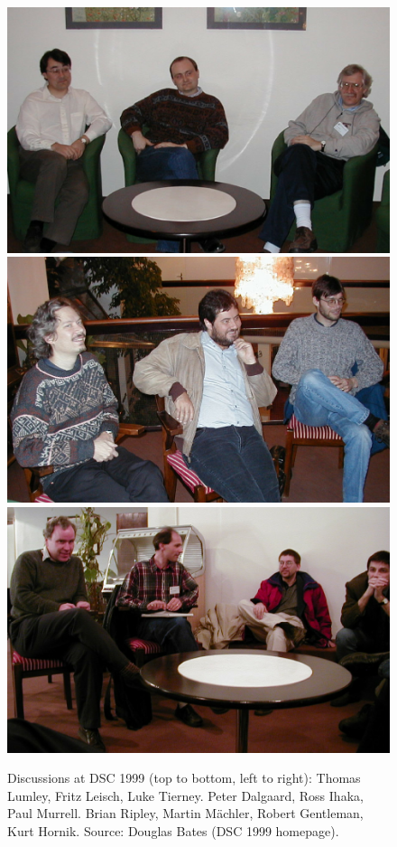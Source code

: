 \begin{figure}[p!]

{\centering \includegraphics[width=0.83\linewidth]{fritz_files/figure-latex/dsc1999-1} \includegraphics[width=0.83\linewidth]{fritz_files/figure-latex/dsc1999-2} \includegraphics[width=0.83\linewidth]{fritz_files/figure-latex/dsc1999-3} 

}

\caption{Discussions at DSC 1999 (top to bottom, left to right): Thomas Lumley, Fritz Leisch, Luke Tierney. Peter Dalgaard, Ross Ihaka, Paul Murrell. Brian Ripley, Martin Mächler, Robert Gentleman, Kurt Hornik. Source: Douglas Bates (DSC 1999 homepage).}\label{fig:dsc1999}
\end{figure}

